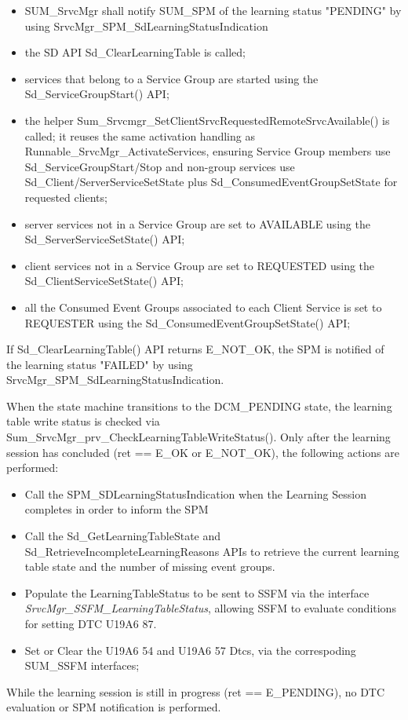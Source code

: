 \begin{itemize}
\item SUM\_SrvcMgr shall notify SUM\_SPM of the learning status "PENDING" by using SrvcMgr_SPM_SdLearningStatusIndication
\item the SD API Sd\_ClearLearningTable is called; 
\item services that belong to a Service Group are started using the Sd_ServiceGroupStart() API;
\item the helper Sum\_Srvcmgr\_SetClientSrvcRequestedRemoteSrvcAvailable() is called; it reuses the same activation handling as Runnable\_SrvcMgr\_ActivateServices, ensuring Service Group members use Sd\_ServiceGroupStart/Stop and non-group services use Sd\_Client/ServerServiceSetState plus Sd\_ConsumedEventGroupSetState for requested clients;
\item server services not in a Service Group are set to AVAILABLE using the Sd_ServerServiceSetState() API;
\item client services not in a Service Group are set to REQUESTED using the Sd_ClientServiceSetState() API;
\item all the Consumed Event Groups associated to each Client Service is set to REQUESTER using the Sd_ConsumedEventGroupSetState() API;
\end{itemize}

If Sd_ClearLearningTable() API returns E_NOT_OK, the SPM is notified of the learning status "FAILED" by using SrvcMgr_SPM_SdLearningStatusIndication.

When the state machine transitions to the DCM\_PENDING state, the learning table write status is checked via Sum\_SrvcMgr\_prv\_CheckLearningTableWriteStatus(). Only after the learning session has concluded (ret == E\_OK or E\_NOT\_OK), the following actions are performed:
\begin{itemize}
    \item Call the SPM_SDLearningStatusIndication when the Learning Session completes in order to inform the SPM
    \item Call the Sd_GetLearningTableState and Sd\_RetrieveIncompleteLearningReasons APIs to retrieve the current learning table state and the number of missing event groups.
    \item Populate the LearningTableStatus to be sent to SSFM via the interface \textit{SrvcMgr_SSFM_LearningTableStatus}, allowing SSFM to evaluate conditions for setting DTC U19A6 87.
    \item Set or Clear the  U19A6 54  and U19A6 57 Dtcs, via the correspoding SUM\_SSFM interfaces;
\end{itemize}
While the learning session is still in progress (ret == E\_PENDING), no DTC evaluation or SPM notification is performed.

